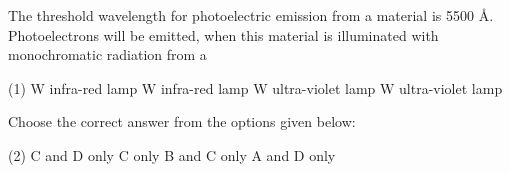\item The threshold wavelength for photoelectric emission from a material is 5500 \(\text{\AA}\). Photoelectrons will be emitted, when this material is illuminated with monochromatic radiation from a
\begin{tasks}(1)
     W infra-red lamp
     W infra-red lamp
     W ultra-violet lamp
     W ultra-violet lamp
\end{tasks}

Choose the correct answer from the options given below:
\begin{tasks}(2)
    \task C and D only
    \task C only
    \task B and C only
    \task A and D only
\end{tasks}
